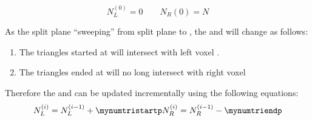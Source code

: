 \begin{displaymath} 
    N_{L}^{(0)} = 0 \qquad N_{R}{(0)} = N
\end{displaymath} 

As the split plane ``sweeping'' from split plane  to , the \mynumtrileft and \mynumtriright will change as follows: 
\begin{enumerate} 
    \item The triangles started at  will intersect with left voxel \myleftchildbox. 
    \item The triangles ended at  will no long intersect with right voxel \myrightchildbox 
\end{enumerate}

Therefore the \mynumtrileft and \mynumtriright can be updated incrementally using the following equations: 
\begin{equation}
    \label{eq:SweepUpdate}
    N_{L}^{(i)} = N_{L}^{(i-1)} + \mynumtristartp
    N_{R}^{(i)} = N_{R}^{(i-1)} - \mynumtriendp 
\end{equation}

